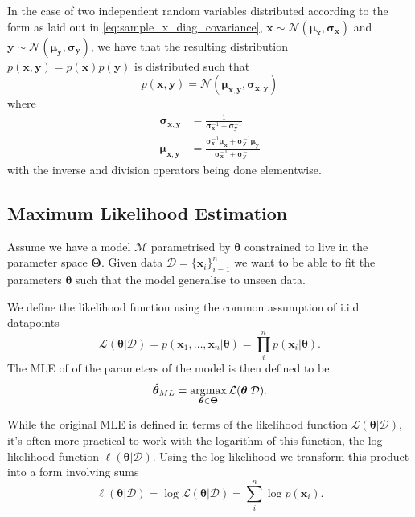 In the case of two independent random variables distributed according to the form as laid
out in \eqref{eq:sample_x_diag_covariance}, $\bm{x} \sim
\mathcal{N}(\bm{\mu}_{\bm{x}}, \bm{\sigma}_{\bm{x}})$
and $\bm{y} \sim \mathcal{N}(\bm{\mu}_{\bm{y}}, \bm{\sigma}_{\bm{y}})$, we have that the resulting distribution $p(\bm{x}, \bm{y}) =
p(\bm{x})p(\bm{y})$ is distributed such that
\begin{equation*}
  p(\bm{x}, \bm{y}) = \mathcal{N}(\bm{\mu}_{\bm{x}, \bm{y}}, \bm{\sigma}_{\bm{x}, \bm{y}})
\end{equation*}
where
\begin{align}
  \bm{\sigma}_{\bm{x}, \bm{y}} & = \frac{1}{\bm{\sigma}_{\bm{x}}^{-1} + \bm{\sigma}_{\bm{y}}^{-1}} \label{eq:joint_indep_normal_covariance_diag}\\
  \bm{\mu}_{\bm{x}, \bm{y}} & = \frac{\bm{\sigma}_{\bm{x}}^{-1}\bm{\mu}_{\bm{x}} + \bm{\sigma}_{\bm{y}}^{-1}\bm{\mu}_{\bm{y}}}{\bm{\sigma}_{\bm{x}}^{-1} + \bm{\sigma}_{\bm{y}}^{-1}} \label{eq:joint_indep_normal_mean_diag}
\end{align}
with the inverse and division operators being done elementwise.

\subsection{Maximum Likelihood Estimation}

Assume we have a model $\mathcal{M}$ parametrised by $\bm{\theta}$ constrained
to live in the parameter space $\bm{\Theta}$. Given data $\mathcal{D} = \{\bm{x}_i\}_{i=1}^n$ we want
to be able to fit the parameters $\bm{\theta}$ such that the model generalise to
unseen data.

We define the likelihood function using the common assumption of i.i.d datapoints
\begin{equation}
  \label{eq:likelihood}
  \mathcal{L}(\bm{\theta} | \mathcal{D}) = p(\bm{x}_1, \dots, \bm{x}_n | \bm{\theta}) = \prod_i^n p(\bm{x}_i | \bm{\theta}).
\end{equation}
The MLE of of the parameters of the model is then defined to be
\begin{equation}
  \label{eq:MLE}
  \hat{\bm{\theta}}_{ML} = \operatorname*{\arg\!\max}_{\bm{\theta} \in \bm{\Theta}}\mathcal{L}(\bm{\theta} | \mathcal{D}).
\end{equation}

While the original MLE is defined in terms of the likelihood function
$\mathcal{L}(\bm{\theta}| \mathcal{D})$, it's often more practical to work with
the logarithm of this function, the log-likelihood function $\ell(\bm{\theta} |
\mathcal{D})$. Using the log-likelihood we transform this product into a form involving sums
\begin{equation}
  \label{eq:loglikelihood}
  \ell(\bm{\theta} | \mathcal{D}) = \log \mathcal{L}(\bm{\theta} | \mathcal{D}) = \sum_i^n \log p(\bm{x}_i).
\end{equation} \cite{CaseBerg:01}

